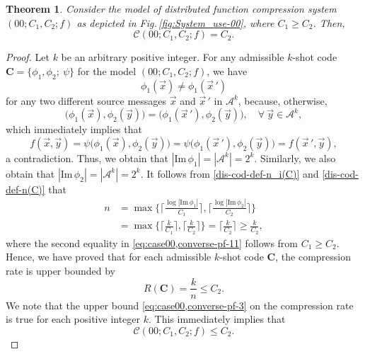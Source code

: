 \documentclass[11pt,draftclsnofoot,onecolumn]{IEEEtran}
\newtheorem{theorem}{Theorem}
\newcommand{\mbC}{\mathbf{C}}
\def\Im{\mathrm{Im}}
\begin{document}
\begin{theorem}\label{thm:00-comp-cap}
Consider the model of distributed function compression system $(00;C_{1}, C_{2};  f)$ as depicted in Fig.\,\ref{fig:System_use-00}, where $C_1\geq C_2$. Then,
\begin{equation*}
\mathcal{C}(00;C_1,C_2;f)=C_2.
\end{equation*}
\end{theorem}

  \begin{proof}
 Let $k$ be an arbitrary positive integer. For  any admissible $k$-shot code  $\mbC=\big\{\phi_{1},\phi_{2};~\psi\big\}$ for the model $(00;C_1,C_2;f)$, we have
 \begin{equation*}
\phi_{1}(\vec{x})\neq\phi_{1}(\vec{x}\,')\label{eq:case00,converse-pf-0}
\end{equation*}
for any two different source messages $\vec{x}$ and $\vec{x}\,'$ in $\mathcal{A}^k$, because, otherwise,
\begin{equation*}
\big(\phi_1(\vec{x}),\phi_2(\vec{y})\big)=\big(\phi_1(\vec{x}\,'),\phi_2(\vec{y})\big),
\quad\forall~\vec{y}\in\mathcal{A}^k,
\end{equation*}
which immediately implies that
\begin{equation*}
f(\vec{x},\vec{y})=\psi\big(\phi_1(\vec{x}),\phi_2(\vec{y})\big)=\psi\big(\phi_1(\vec{x}\,'),\phi_2(\vec{y})\big)=
f(\vec{x}\,',\vec{y}),
\end{equation*}
a contradiction.
Thus, we obtain that
$|\Im\,\phi_{1}|=|\mathcal{A}^k|=2^k.$
Similarly, we also obtain that  $|\Im\,\phi_{2}|=|\mathcal{A}^k|=2^k.$
It follows from \eqref{dis-cod-def-n_i(C)} and \eqref{dis-cod-def-n(C)} that
 \begin{align}
 n&=\max\bigg\{\bigg\lceil\frac{\log|\Im\,\phi_{1}|}{C_1}\bigg\rceil,\bigg\lceil\frac{\log|\Im\,\phi_{2}|}{C_2}
\bigg\rceil\bigg\}\nonumber\\&=\max\bigg\{\bigg\lceil\frac{k}{C_1}\bigg\rceil,\bigg\lceil\frac{k}{C_2}
\bigg\rceil\bigg\}
=\bigg\lceil\frac{k}{C_2}
\bigg\rceil\geq\frac{k}{C_2},\label{eq:case00,converse-pf-11}
\end{align}
where the second equality in \eqref{eq:case00,converse-pf-11} follows from $C_1\geq C_2$. Hence, we have proved that for each admissible $k$-shot code $\mbC$, the compression rate is upper bounded by
\begin{equation}
R(\mbC)=\frac{k}{n}\leq C_2.\label{eq:case00,converse-pf-3}
\end{equation}
We note that the upper bound \eqref{eq:case00,converse-pf-3} on the compression rate is true for each positive integer $k$. This immediately implies that
  \begin{equation}
  \mathcal{C}(00;C_1,C_2;f)\leq C_2.\label{00-mod-upp-bound}
  \end{equation}


\end{proof}
\end{document}
